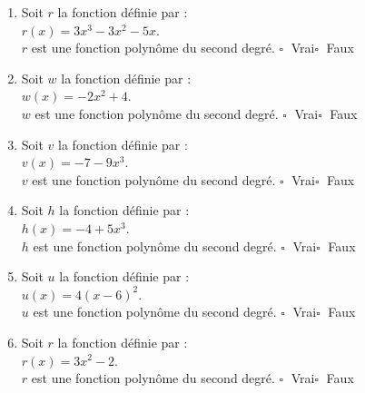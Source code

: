 \begin{multicols}{2}
\begin{enumerate}[itemsep=1em]
	\item \begin{minipage}[t]{\linewidth} Soit $r$ la fonction définie  par :\\
              $r(x)=3x^3-3x^2-5x$. \\
              $r$ est une fonction polynôme du second degré.	$\square\;$ Vrai\qquad $\square\;$ Faux\qquad  \end{minipage}
	\item \begin{minipage}[t]{\linewidth} Soit $w$ la fonction définie  par :\\
            $w(x)=-2x^2+4$. \\
            $w$ est une fonction polynôme du second degré.	$\square\;$ Vrai\qquad $\square\;$ Faux\qquad  \end{minipage}
	\item \begin{minipage}[t]{\linewidth} Soit $v$ la fonction définie  par :\\
              $v(x)=-7-9x^3$. \\
              $v$ est une fonction polynôme du second degré.	$\square\;$ Vrai\qquad $\square\;$ Faux\qquad  \end{minipage}
	\item \begin{minipage}[t]{\linewidth} Soit $h$ la fonction définie  par :\\
              $h(x)=-4+5x^3$. \\
              $h$ est une fonction polynôme du second degré.	$\square\;$ Vrai\qquad $\square\;$ Faux\qquad  \end{minipage}
	\item \begin{minipage}[t]{\linewidth} Soit $u$ la fonction définie  par :\\
                  $u(x)=4(x-6)^2$. \\
                  $u$ est une fonction polynôme du second degré.	$\square\;$ Vrai\qquad $\square\;$ Faux\qquad  \end{minipage}
	\item \begin{minipage}[t]{\linewidth} Soit $r$ la fonction définie  par :\\
            $r(x)=3x^2-2$. \\
            $r$ est une fonction polynôme du second degré.	$\square\;$ Vrai\qquad $\square\;$ Faux\qquad  \end{minipage}

\end{enumerate}
\end{multicols}
